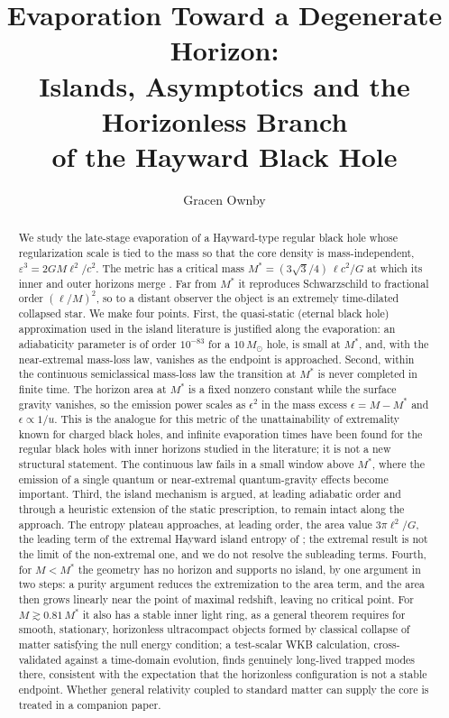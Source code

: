 \documentclass[11pt]{article}
\title{Evaporation Toward a Degenerate Horizon:\\
Islands, Asymptotics and the Horizonless Branch\\
of the Hayward Black Hole}
\author{Gracen Ownby}
\date{}
\begin{document}
\maketitle

\begin{abstract}
We study the late-stage evaporation of a Hayward-type regular black hole whose regularization scale is tied to the mass so that the core density is mass-independent, $\varepsilon^3=2GM\ell^2/c^2$. The metric has a critical mass $M^*=(3\sqrt3/4)\,\ell c^2/G$ at which its inner and outer horizons merge \citep{Hayward2006,KimNam2021}. Far from $M^*$ it reproduces Schwarzschild to fractional order $(\ell/M)^2$, so to a distant observer the object is an extremely time-dilated collapsed star. We make four points. First, the quasi-static (eternal black hole) approximation used in the island literature is justified along the evaporation: an adiabaticity parameter is of order $10^{-83}$ for a $10\,M_\odot$ hole, is small at $M^*$, and, with the near-extremal mass-loss law, vanishes as the endpoint is approached. Second, within the continuous semiclassical mass-loss law the transition at $M^*$ is never completed in finite time. The horizon area at $M^*$ is a fixed nonzero constant while the surface gravity vanishes, so the emission power scales as $\epsilon^2$ in the mass excess $\epsilon=M-M^*$ and $\epsilon\propto1/u$. This is the analogue for this metric of the unattainability of extremality known for charged black holes, and infinite evaporation times have been found for the regular black holes with inner horizons studied in the literature; it is not a new structural statement. The continuous law fails in a small window above $M^*$, where the emission of a single quantum or near-extremal quantum-gravity effects become important. Third, the island mechanism is argued, at leading adiabatic order and through a heuristic extension of the static prescription, to remain intact along the approach. The entropy plateau approaches, at leading order, the area value $3\pi\ell^2/G$, the leading term of the extremal Hayward island entropy of \citet{KimNam2021}; the extremal result is not the limit of the non-extremal one, and we do not resolve the subleading terms. Fourth, for $M<M^*$ the geometry has no horizon and supports no island, by one argument in two steps: a purity argument reduces the extremization to the area term, and the area then grows linearly near the point of maximal redshift, leaving no critical point. For $M\gtrsim0.81\,M^*$ it also has a stable inner light ring, as a general theorem requires for smooth, stationary, horizonless ultracompact objects formed by classical collapse of matter satisfying the null energy condition; a test-scalar WKB calculation, cross-validated against a time-domain evolution, finds genuinely long-lived trapped modes there, consistent with the expectation that the horizonless configuration is not a stable endpoint. Whether general relativity coupled to standard matter can supply the core is treated in a companion paper.
\end{abstract}
\end{document}
